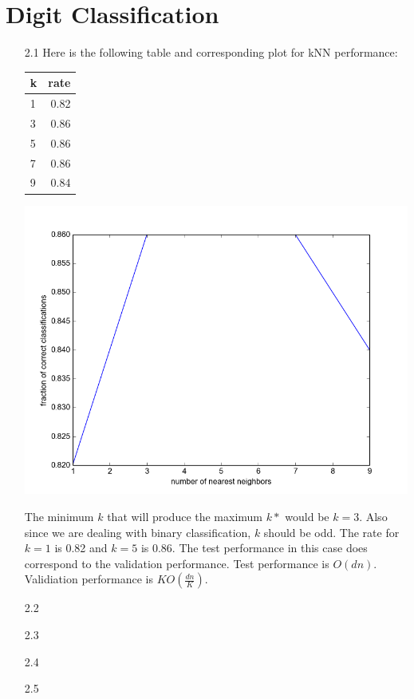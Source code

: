 \documentclass[letterpaper, 12pt]{article}
\begin{document}
\section*{Digit Classification}
\begin{itemize}
	\item[2.1]
		Here is the following table and corresponding plot for kNN performance: \\
		\begin{center}
			\begin{tabular}{ l | r }
				k &rate\\
				\hline
				1 &0.82\\
				3 &0.86\\
				5 &0.86\\
				7 &0.86\\
				9 &0.84
			\end{tabular}
		\end{center}
		\begin{center}
			\includegraphics[scale=0.25]{figure_1.png}
		\end{center}

		The minimum $k$ that will produce the maximum $k*$ would be $k = 3$. Also since we are dealing with binary classification, $k$ should be odd. The rate for $k = 1$ is 0.82 and $k = 5$ is 0.86. The test performance in this case does correspond to the validation performance. Test performance is $O(dn)$. Validiation performance is $KO(\frac{dn}{K})$.

	\item[2.2]
	\item[2.3]
	\item[2.4]
	\item[2.5]
\end{itemize}
\end{document}
